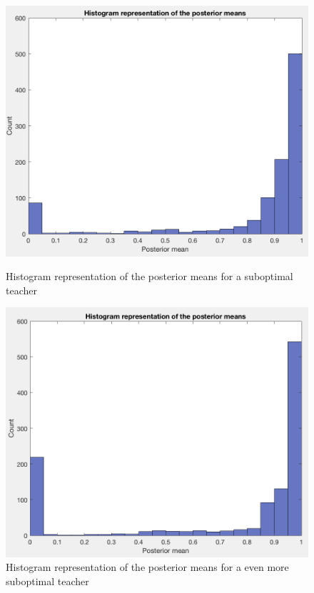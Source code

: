 \documentclass[a4paper]{report}
\begin{document}
{{{{				\begin{figure}[ht!]
					\begin{minipage}{0.5\linewidth}
						\begin{center}
							\includegraphics[width=0.95\linewidth]{post_mean_120}
							\caption{Histogram representation of the posterior means for a suboptimal teacher}
							\label{fig::post_mean_120}
						\end{center}
					\end{minipage}
					\begin{minipage}{0.5\linewidth}
						\begin{center}
							\includegraphics[width=0.95\linewidth]{post_mean_50}
							\caption{Histogram representation of the posterior means for a even more suboptimal teacher}
							\label{fig::post_mean_50}
						\end{center}
					\end{minipage}
				\end{figure}
				
}}}}
\end{document}
